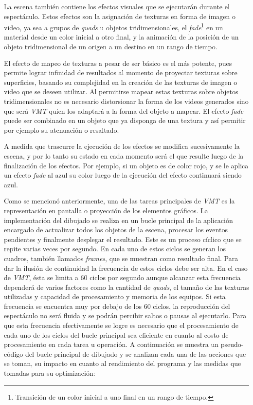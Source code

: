 La escena también contiene los efectos visuales que se ejecutarán durante el espectáculo. Estos efectos son la asignación de texturas en forma de imagen o video, ya sea a grupos de \emph{quads} u objetos tridimensionales, el \emph{fade}\footnote{Transición de un color inicial a uno final en un rango de tiempo.} en un material desde un color inicial a otro final, y la animación de la posición de un objeto tridimensional de un origen a un destino en un rango de tiempo.

El efecto de mapeo de texturas a pesar de ser básico es el más potente, pues permite lograr infinidad de resultados al momento de proyectar texturas sobre superficies, basando su complejidad en la creación de las texturas de imagen o video que se deseen utilizar. Al permitirse mapear estas texturas sobre objetos tridimensionales no es necesario distorsionar la forma de los videos generados sino que será \emph{VMT} quien los adaptará a la forma del objeto a mapear. El efecto \emph{fade} puede ser combinado en un objeto que ya disponga de una textura y así permitir por ejemplo su atenuación o resaltado.

A medida que trascurre la ejecución de los efectos se modifica sucesivamente la escena, y por lo tanto su estado en cada momento será el que resulte luego de la finalización de los efectos. Por ejemplo, si un objeto es de color rojo, y se le aplica un efecto \emph{fade} al azul su color luego de la ejecución del efecto continuará siendo azul.

Como se mencionó anteriormente, una de las tareas principales de \emph{VMT} es la representación en pantalla o proyección de los elementos gráficos. La implementación del dibujado se realiza en un bucle principal de la aplicación encargado de actualizar todos los objetos de la escena, procesar los eventos pendientes y finalmente desplegar el resultado.
Este es un proceso cíclico que se repite varias veces por segundo.
En cada uno de estos ciclos se generan los cuadros, también llamados \emph{frames}, que se muestran como resultado final.
Para dar la ilusión de continuidad la frecuencia de estos ciclos debe ser alta. En el caso de \emph{VMT}, ésta se limita a 60 ciclos por segundo aunque alcanzar esta frecuencia dependerá de varios factores como la cantidad de \emph{quads}, el tamaño de las texturas utilizadas y capacidad de procesamiento y memoria de los equipos.
Si esta frecuencia se encuentra muy por debajo de los 60 ciclos, la reproducción del espectáculo no será fluida y se podrán percibir saltos o pausas al ejecutarlo.
Para que esta frecuencia efectivamente se logre es necesario que el procesamiento de cada uno de los ciclos del bucle principal sea eficiente en cuanto al costo de procesamiento en cada tarea u operación. A continuación se muestra un pseudo-código del bucle principal de dibujado y se analizan cada una de las acciones que se toman, su impacto en cuanto al rendimiento del programa y las medidas que tomadas para su optimización:

